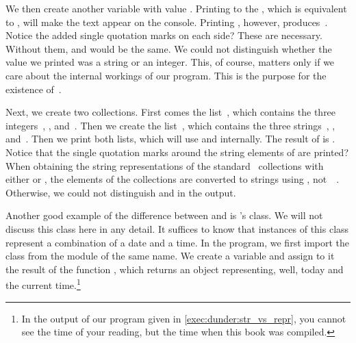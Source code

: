 We then create another variable  with value .
Printing  to the , which is equivalent to , will make the text  appear on the console.
Printing , however, produces~.
Notice the added single quotation marks on each side?
These are necessary.
Without them,  and  would be the same.
We could not distinguish whether the value we printed was a string or an integer.
This, of course, matters only if we care about the internal workings of our program.
This is the purpose for the existence of~.%
%
\begin{sloppypar}%
Next, we create two collections.
First comes the list~, which contains the three integers~, , and~.
Then we create the list~, which contains the three strings~, , and~.
Then we print both lists, which will use  and  internally.
The result of  is .
Notice that the single quotation marks around the string elements of  are printed?
When obtaining the string representations of the standard \python\ collections with either  or , the elements of the collections are converted to strings using , not~~\cite{PEP3140}.
Otherwise, we could not distinguish  and  in the output.%
\end{sloppypar}%
%
Another good example of the difference between  and  is \python's  class.
We will not discuss this class here in any detail.
It suffices to know that instances of this class represent a combination of a date and a time.
In the program, we first import the class  from the module of the same name.
We create a variable  and assign to it the result of the function , which returns an object representing, well, today and the current time.\footnote{%
In the output of our program given in \cref{exec:dunder:str_vs_repr}, you cannot see the time of your reading, but the time when this book was compiled.}

